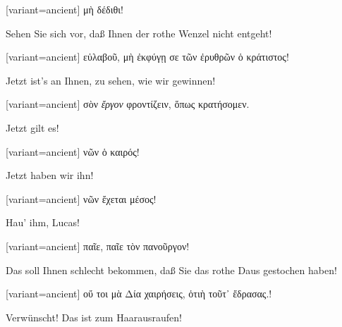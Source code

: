 \begin{greek}[variant=ancient]%
μὴ δέδιθι!

\end{greek}%
\switchcolumn*

Sehen Sie sich vor, daß Ihnen der rothe Wenzel nicht entgeht!

\switchcolumn

\begin{greek}[variant=ancient]%
εὐλαβοῦ, μὴ ἐκφύγῃ σε τῶν ἐρυθρῶν ὁ κράτιστος!

\end{greek}%
\switchcolumn*

Jetzt ist's an Ihnen, zu sehen, wie wir gewinnen!

\switchcolumn

\begin{greek}[variant=ancient]%
σὸν \emph{ἔργον} φροντίζειν, ὅπως κρατήσομεν.

\end{greek}%
\switchcolumn*

Jetzt gilt es!

\switchcolumn

\begin{greek}[variant=ancient]%
νῶν ὁ καιρός!

\end{greek}%
\switchcolumn*

Jetzt haben wir ihn! 

\switchcolumn

\begin{greek}[variant=ancient]%
νῶν ἔχεται μέσος!

\end{greek}%
\switchcolumn*

Hau' ihm, Lucas!

\switchcolumn

\begin{greek}[variant=ancient]%
παῖε, παῖε τὸν πανοῦργον!

\end{greek}%
\switchcolumn*

Das soll Ihnen schlecht bekommen, daß Sie das rothe Daus gestochen
haben!

\switchcolumn

\begin{greek}[variant=ancient]%
οὔ τοι μὰ Δία χαιρήσεις, ὁτιὴ τοῦτ᾽ ἔδρασας.!

\end{greek}%
\switchcolumn*

Verwünscht! Das ist zum Haaraus\textcompwordmark{}raufen!

